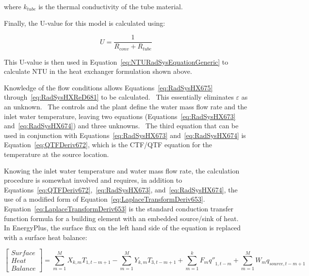 where \(k_{tube}\) is the thermal conductivity of the tube material.

Finally, the U-value for this model is calculated using:

\begin{equation}
U = \frac{1}{{R_{conv}} + {R_{tube}}}
\end{equation}

This U-value is then used in Equation~\ref{eq:NTURadSysEquationGeneric} to calculate NTU in the heat exchanger formulation shown above.

Knowledge of the flow conditions allows Equations~\ref{eq:RadSysHX675} through~\ref{eq:RadSysHXReD681} to be calculated.~ This essentially eliminates \(\varepsilon\) as an unknown.~ The controls and the plant define the water mass flow rate and the inlet water temperature, leaving two equations (Equations~\ref{eq:RadSysHX673} and~\ref{eq:RadSysHX674}) and three unknowns.~ The third equation that can be used in conjunction with Equations~\ref{eq:RadSysHX673} and~\ref{eq:RadSysHX674} is Equation~\ref{eq:QTFDeriv672}, which is the CTF/QTF equation for the temperature at the source location.

Knowing the inlet water temperature and water mass flow rate, the calculation procedure is somewhat involved and requires, in addition to Equations~\ref{eq:QTFDeriv672},~\ref{eq:RadSysHX673}, and~\ref{eq:RadSysHX674}, the use of a modified form of Equation~\ref{eq:LaplaceTransformDeriv653}.~ Equation~\ref{eq:LaplaceTransformDeriv653} is the standard conduction transfer function formula for a building element with an embedded source/sink of heat.~ In EnergyPlus, the surface flux on the left hand side of the equation is replaced with a surface heat balance:

\begin{equation}
\left[ {\begin{array}{ccc}{Surface}\\ {Heat}\\ {Balance}\end{array}} \right] = \sum\limits_{m = 1}^M {{X_{k,m}}{T_{1,t - m + 1}}}  - \sum\limits_{m = 1}^M {{Y_{k,m}}{T_{3,t - m + 1}}}  + \sum\limits_{m = 1}^k {{F_m}{{q''}_{1,t - m}}}  + \sum\limits_{m = 1}^M {{W_m}{q_{source,t - m + 1}}}
\label{eq:RadSysHX682}
\end{equation}

